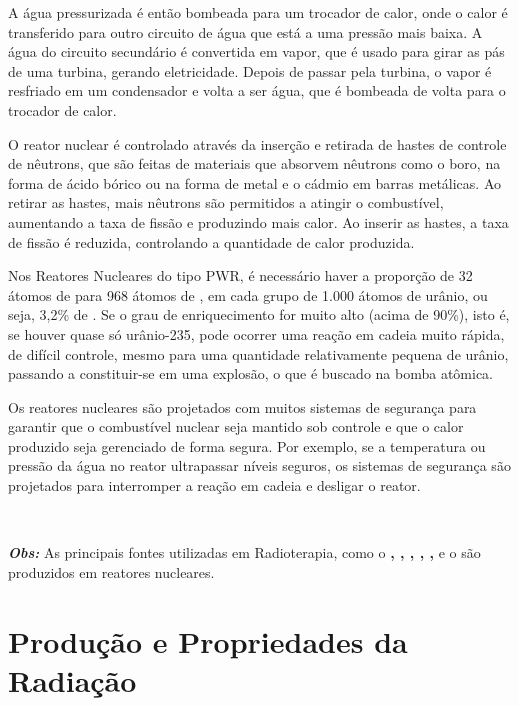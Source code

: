 \documentclass[11pt,a4paper]{article}
\newcounter{exemplo}
\begin{document}
    A água pressurizada é então bombeada para um trocador de calor, onde o calor é transferido para outro circuito de água que está a uma pressão mais baixa. A água do circuito secundário é convertida em vapor, que é usado para girar as pás de uma turbina, gerando eletricidade. Depois de passar pela turbina, o vapor é resfriado em um condensador e volta a ser água, que é bombeada de volta para o trocador de calor.
                
    O reator nuclear é controlado através da inserção e retirada de hastes de controle de nêutrons, que são feitas de materiais que absorvem nêutrons como o boro, na forma de ácido bórico ou na forma de metal e o cádmio em barras metálicas. Ao retirar as hastes, mais nêutrons são permitidos a atingir o combustível, aumentando a taxa de fissão e produzindo mais calor. Ao inserir as hastes, a taxa de fissão é reduzida, controlando a quantidade de calor produzida.

    Nos Reatores Nucleares do tipo PWR, é necessário haver a proporção de 32 átomos de  para 968 átomos de , em cada grupo de 1.000 átomos de urânio, ou seja, 3,2\% de . Se o grau de enriquecimento for muito alto (acima de 90\%), isto é, se houver quase só urânio-235, pode ocorrer uma reação em cadeia muito rápida, de difícil controle, mesmo para uma quantidade relativamente pequena de urânio, passando a constituir-se em uma explosão, o que é buscado na bomba atômica.
                
    Os reatores nucleares são projetados com muitos sistemas de segurança para garantir que o combustível nuclear seja mantido sob controle e que o calor produzido seja gerenciado de forma segura. Por exemplo, se a temperatura ou pressão da água no reator ultrapassar níveis seguros, os sistemas de segurança são projetados para interromper a reação em cadeia e desligar o reator.
                
                \

                \noindent \textbf{\textit{\textcolor{CarnationPink}{Obs:}}} As principais fontes utilizadas em Radioterapia, como o \textbf{, , , , , } e o \textbf{} são produzidos em reatores nucleares.  
    
\section{Produção e Propriedades da Radiação}
        
\end{document}
